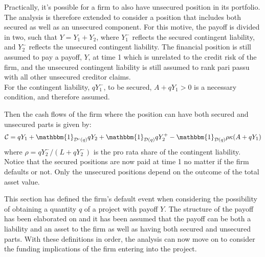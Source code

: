 \documentclass[main.tex]{subfiles}
\begin{document}
        Practically, it's possible for a firm to also have unsecured position in its portfolio.
        The analysis is therefore extended to consider a position that includes both secured as well as an unsecured component.
        For this motive, the payoff is divided in two, such that $Y=Y_1 + Y_2$, where $Y_1^{-}$ reflects the secured contingent liability, and $Y_2^{-}$ reflects the unsecured contingent liability.
        The financial position is still assumed to pay a payoff, $Y$, at time 1 which is unrelated to the credit risk of the firm, and the unsecured contingent liability is still assumed to rank pari passu with all other unsecured creditor claims.\\
        For the contingent liability, $qY_1^{-}$, to be secured, $A+qY_1 > 0$ is a necessary condition, and therefore assumed.

        Then the cash flows of the firm where the position 
        can have both secured and unsecured parts is given by:
        \begin{equation}
            \mathcal{C} =
                q Y_{1}
                + \mathbbm{1}_{\mathcal{D}^{c}(q)} qY_{2}
                + \mathbbm{1}_{\mathcal{D}(q)} qY_{2}^{+}
                - \mathbbm{1}_{\mathcal{D}(q)} \rho\kappa (A + qY_{1})
        \end{equation}
        where $\rho = qY_{2}^{-}/(L + qY_{2}^{-})$ is the pro rata share of the contingent liability. 
        Notice that the secured positions are now paid at time 1 no matter if the firm defaults or not. 
        Only the unsecured positions depend on the outcome of the total asset value.

        This section has defined the firm's default event when considering the possibility
        of obtaining a quantity $q$ of a project with payoff $Y$.
        The structure of the payoff has been elaborated on
        and it has been assumed that the payoff can be both a liability and an asset to the firm
        as well as having both secured and unsecured parts.
        With these definitions in order, the analysis can now move on to consider the
        funding implications of the firm entering into the project.
        
\end{document}
